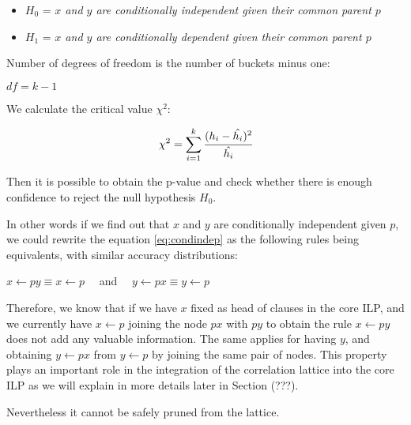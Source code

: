\begin{itemize}
 \item $H_0$ = \emph{$x$ and $y$ are conditionally independent given their common parent $p$}
 \item $H_1$ = \emph{$x$ and $y$ are conditionally dependent given their common parent $p$} 
\end{itemize}

Number of degrees of freedom is the number of buckets minus one:

\begin{center}
 $df=k-1$
\end{center}

We calculate the critical value $\chi^2$:

\begin{equation}
 \chi^2=\sum_{i=1}^{k} \cfrac{(h_i - \hat{h_i})^2}{\hat{h_i}}
\end{equation}

\cite{Jaroszewicz02pruningredundant}

Then it is possible to obtain the p-value and check whether there is enough confidence to reject the null hypothesis
$H_0$. 


In other words if we find out that $x$ and $y$ are conditionally independent given $p$, we could rewrite the equation
\ref{eq:condindep} as the following rules being equivalents, with similar accuracy distributions:

\begin{center}
  $x \leftarrow py \equiv x \leftarrow p \quad$ and  $\quad y \leftarrow px \equiv y \leftarrow p $
\end{center}

Therefore, we know that if we have $x$ fixed as head of clauses in the core ILP, and we currently have $x \leftarrow p$
joining the node $px$ with $py$ to obtain the rule $x \leftarrow py$ does not add any valuable information. The same
applies
for having $y$, and obtaining $y \leftarrow px$ from $y \leftarrow p$ by joining the same pair of nodes. This property
plays an important role in the integration of the correlation lattice into the core ILP as we will explain in more
details later in Section (???).

Nevertheless it cannot be safely pruned from the lattice.  

